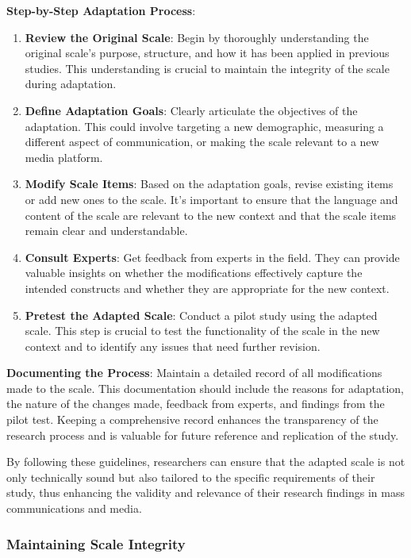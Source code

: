 \documentclass[
]{book}
\providecommand{\tightlist}{%
  \setlength{\itemsep}{0pt}\setlength{\parskip}{0pt}}
\begin{document}
\textbf{Step-by-Step Adaptation Process}:

\begin{enumerate}
\def\labelenumi{\arabic{enumi}.}
\tightlist
\item
  \textbf{Review the Original Scale}: Begin by thoroughly understanding the original scale's purpose, structure, and how it has been applied in previous studies. This understanding is crucial to maintain the integrity of the scale during adaptation.
\item
  \textbf{Define Adaptation Goals}: Clearly articulate the objectives of the adaptation. This could involve targeting a new demographic, measuring a different aspect of communication, or making the scale relevant to a new media platform.
\item
  \textbf{Modify Scale Items}: Based on the adaptation goals, revise existing items or add new ones to the scale. It's important to ensure that the language and content of the scale are relevant to the new context and that the scale items remain clear and understandable.
\item
  \textbf{Consult Experts}: Get feedback from experts in the field. They can provide valuable insights on whether the modifications effectively capture the intended constructs and whether they are appropriate for the new context.
\item
  \textbf{Pretest the Adapted Scale}: Conduct a pilot study using the adapted scale. This step is crucial to test the functionality of the scale in the new context and to identify any issues that need further revision.
\end{enumerate}

\textbf{Documenting the Process}: Maintain a detailed record of all modifications made to the scale. This documentation should include the reasons for adaptation, the nature of the changes made, feedback from experts, and findings from the pilot test. Keeping a comprehensive record enhances the transparency of the research process and is valuable for future reference and replication of the study.

By following these guidelines, researchers can ensure that the adapted scale is not only technically sound but also tailored to the specific requirements of their study, thus enhancing the validity and relevance of their research findings in mass communications and media.

\hypertarget{maintaining-scale-integrity}{%
\subsubsection*{Maintaining Scale Integrity}\label{maintaining-scale-integrity}}
\end{document}
